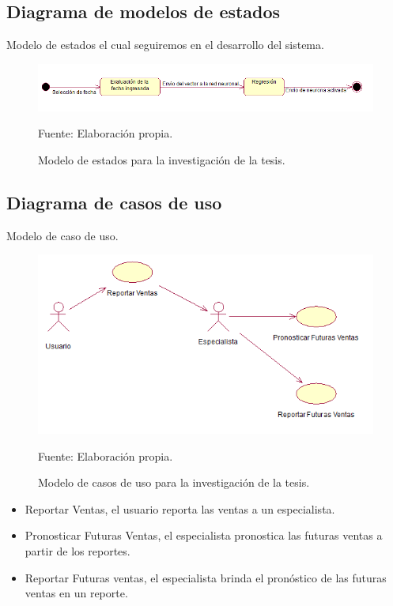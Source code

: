 \subsection{Diagrama de modelos de estados}
Modelo de estados el cual seguiremos en el desarrollo del sistema.

\begin{figure}[h!]
	\centering
		\includegraphics[scale=0.7]{imagenes/modeloestados.png}
		\caption{Modelo de estados para la investigación de la tesis.}
	\begin{center}
    Fuente: Elaboración propia.
    \end{center}
	\label{fig:ModeloEstado}
\end{figure}

\subsection{Diagrama de casos de uso}
Modelo de caso de uso.

\begin{figure}[h!]
	\centering
		\includegraphics[scale=0.7]{imagenes/usecase.png}
		\caption{Modelo de casos de uso para la investigación de la tesis.}
	\begin{center}
    Fuente: Elaboración propia.
    \end{center}
	\label{fig:diagramaCasosUsoTesis}
\end{figure}
\begin{itemize}
    \item Reportar Ventas, el usuario reporta las ventas a un especialista.
    \item Pronosticar Futuras Ventas, el especialista pronostica las futuras ventas a partir de los reportes.
    \item Reportar Futuras ventas, el especialista brinda el pronóstico de las futuras ventas en un reporte.
\end{itemize}

